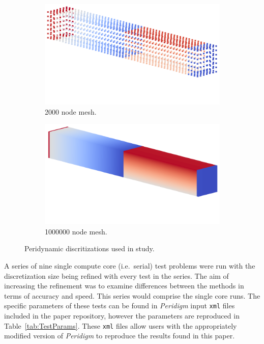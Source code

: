 \documentclass[preprint,12pt]{elsarticle}
\begin{document}
\begin{figure}[tbp] 
    \centering 
    \begin{subfigure}[b]{0.4\textwidth}
        \includegraphics[width=\textwidth]{./figs/mesh2000_replacement.png}
        \caption{2000 node mesh.}
        \label{fig:MCMesh}
    \end{subfigure}
    \begin{subfigure}[b]{0.4\textwidth}
        \includegraphics[width=\textwidth]{./figs/mesh1000000_replacement.png}
        \caption{1000000 node mesh.}
        \label{fig:SCMesh}
    \end{subfigure}
    \caption{Peridynamic discritizations used in study.}
    \label{fig:pd_discrete}
\end{figure}

A series of nine single compute core (i.e.\ serial) test problems were run with
the discretization size being refined with every test in the series. The aim of
increasing the refinement was to examine differences between the methods in
terms of accuracy and speed. This series would comprise the single core runs. 
The specific parameters of these tests can be found in \emph{Peridigm} input
{\tt xml} files included in the paper repository, however the parameters
are reproduced in Table~\ref{tab:TestParams}. These {\tt xml} files allow
users with the appropriately modified version of \emph{Peridigm} to reproduce
the results found in this paper.
\end{document}
